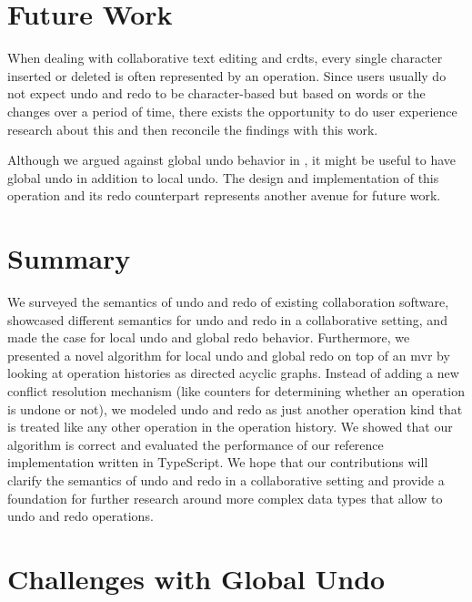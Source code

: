 \documentclass[sigplan,natbib=false,review]{acmart}
\begin{document}
\section{Future Work}\label{sec:future-work}

When dealing with collaborative text editing and \glspl*{crdt},
every single character inserted or deleted is often represented by an operation.
Since users usually do not expect undo and redo to be character-based but
based on words or the changes over a period of time, there exists the opportunity
to do user experience research about this and then reconcile the findings
with this work.

Although we argued against global undo behavior in ,
it might be useful to have global undo in addition to local undo.
The design and implementation of this operation and its redo counterpart
represents another avenue for future work.

\section{Summary}\label{sec:summary}

We surveyed the semantics of undo and redo of existing collaboration software,
showcased different semantics for undo and redo in a collaborative setting,
and made the case for local undo and global redo behavior.
Furthermore, we presented a novel algorithm for local undo and global redo
on top of an \gls*{mvr} by looking at operation histories
as directed acyclic graphs.
Instead of adding a new conflict resolution mechanism (like counters for
determining whether an operation is undone or not), we modeled undo and redo
as just another operation kind that is treated like any other operation in the
operation history.
We showed that our algorithm is correct and evaluated the performance
of our reference implementation written in TypeScript.
We hope that our contributions will clarify the semantics of undo and redo
in a collaborative setting and provide a foundation for further research around
more complex data types that allow to undo and redo operations.

\printbibliography

\appendix

\section{Challenges with Global Undo}\label{adx:global-undo-challenges}
\end{document}
